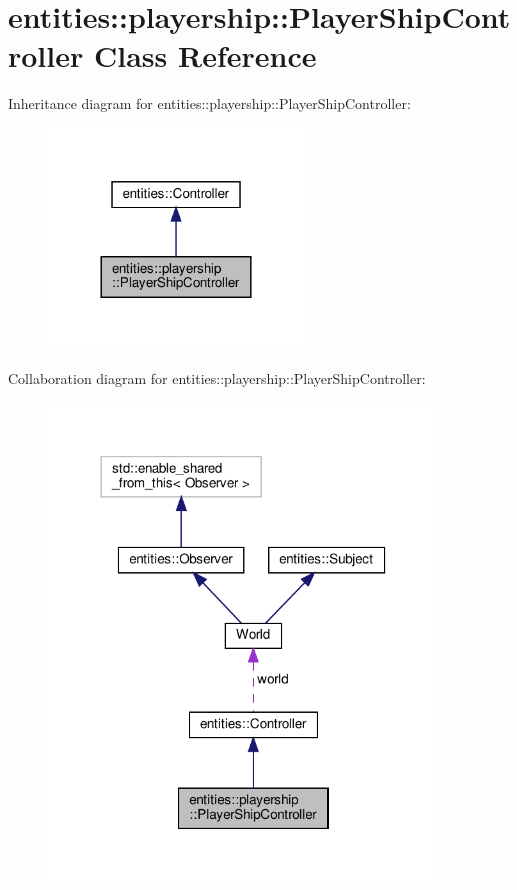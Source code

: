 \hypertarget{classentities_1_1playership_1_1PlayerShipController}{}\section{entities\+:\+:playership\+:\+:Player\+Ship\+Controller Class Reference}
\label{classentities_1_1playership_1_1PlayerShipController}


Inheritance diagram for entities\+:\+:playership\+:\+:Player\+Ship\+Controller\+:\nopagebreak
\begin{figure}[H]
\begin{center}
\leavevmode
\includegraphics[width=192pt]{classentities_1_1playership_1_1PlayerShipController__inherit__graph}
\end{center}
\end{figure}


Collaboration diagram for entities\+:\+:playership\+:\+:Player\+Ship\+Controller\+:\nopagebreak
\begin{figure}[H]
\begin{center}
\leavevmode
\includegraphics[width=293pt]{classentities_1_1playership_1_1PlayerShipController__coll__graph}
\end{center}
\end{figure}
